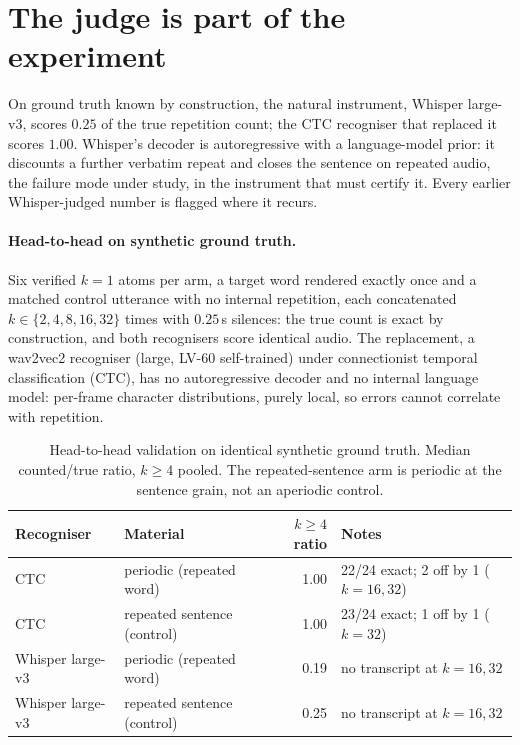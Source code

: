 \section{The judge is part of the experiment}\label{sec:judge}
On ground truth known by construction, the natural instrument, Whisper large-v3, scores $0.25$ of the true
repetition count; the CTC recogniser that replaced it scores $1.00$. Whisper's decoder is autoregressive with a
language-model prior: it discounts a further verbatim repeat and closes the sentence on repeated audio, the failure
mode under study, in the instrument that must certify it. Every earlier Whisper-judged number is flagged where it
recurs.

\paragraph{Head-to-head on synthetic ground truth.}
Six verified $k{=}1$ atoms per arm, a target word rendered exactly once and a matched control utterance with no
internal repetition, each concatenated $k\in\{2,4,8,16,32\}$ times with $0.25\,$s silences: the true count is exact
by construction, and both recognisers score identical audio. The replacement, a wav2vec2 recogniser (large, LV-60
self-trained) under connectionist temporal classification (CTC), has no autoregressive decoder and no internal
language model: per-frame character distributions, purely local, so errors cannot correlate with repetition.
\begin{table}[htbp]
\centering
\caption{Head-to-head validation on identical synthetic ground truth. Median counted/true ratio, $k\ge4$
pooled. The repeated-sentence arm is periodic at the sentence grain, not an aperiodic control.}
\label{tab:ctcval}
\small
\begin{tabular}{@{}llrl@{}}
\toprule
Recogniser & Material & $k\ge4$ ratio & Notes \\
\midrule
CTC & periodic (repeated word) & 1.00 & 22/24 exact; 2 off by 1 ($k{=}16,32$) \\
CTC & repeated sentence (control) & 1.00 & 23/24 exact; 1 off by 1 ($k{=}32$) \\
Whisper large-v3 & periodic (repeated word) & 0.19 & no transcript at $k{=}16,32$ \\
Whisper large-v3 & repeated sentence (control) & 0.25 & no transcript at $k{=}16,32$ \\
\bottomrule
\end{tabular}
\end{table}

